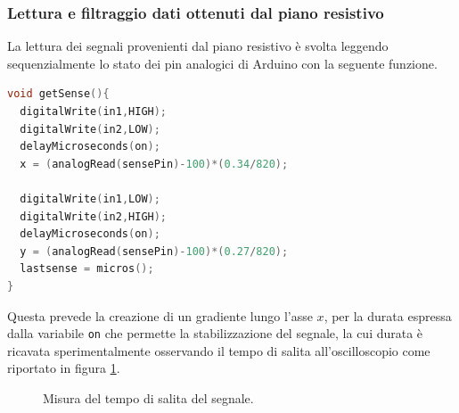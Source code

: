 \documentclass[12pt,twoside,openright]{article}
\begin{document}
\subsubsection{Lettura e filtraggio dati ottenuti dal piano resistivo}
La lettura dei segnali provenienti dal piano resistivo è svolta leggendo sequenzialmente lo stato dei pin analogici di Arduino con la seguente funzione.
\begin{lstlisting}[language=C]
void getSense(){
  digitalWrite(in1,HIGH);
  digitalWrite(in2,LOW);
  delayMicroseconds(on);
  x = (analogRead(sensePin)-100)*(0.34/820);

  digitalWrite(in1,LOW);
  digitalWrite(in2,HIGH);
  delayMicroseconds(on);
  y = (analogRead(sensePin)-100)*(0.27/820);
  lastsense = micros();
}
\end{lstlisting}
Questa prevede la creazione di un gradiente lungo l'asse $x$, per la durata espressa dalla variabile \texttt{on} che permette la stabilizzazione del segnale, la cui durata è ricavata sperimentalmente osservando il tempo di salita all'oscilloscopio come riportato in figura \ref{fig:temposalita}. 
\begin{figure}[h!]
\centering
{}
\caption{Misura del tempo di salita del segnale.} \label{fig:temposalita}
\end{figure}
\end{document}
